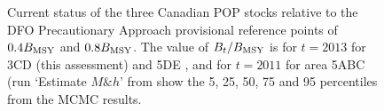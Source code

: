 



\begin{figure}[htp]
\begin{center}
\epsfxsize=6in
\end{center}
\caption{Current status of the three Canadian POP stocks relative to the DFO Precautionary Approach provisional reference points of $0.4 B_\mathrm{MSY}$ and $0.8 B_\mathrm{MSY}$. The value of $B_t / B_\mathrm{MSY}$ is for $t=2013$ for 3CD (this assessment) and 5DE , and for $t=2011$ for area 5ABC (run `Estimate $M \& h$' from  show the 5, 25, 50, 75 and 95 percentiles from the MCMC results.}
\label{fig:compBmsy} 
\end{figure}



